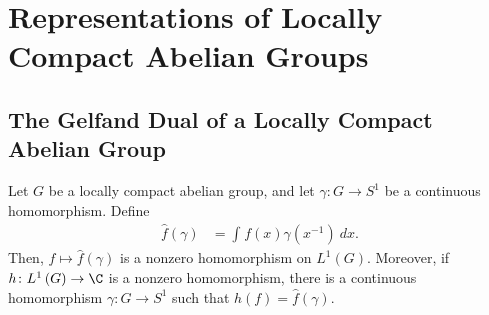 \documentclass[10pt]{mypackage}
\begin{document}
\section{Representations of Locally Compact Abelian Groups}%
\subsection{The Gelfand Dual of a Locally Compact Abelian Group}%
\begin{theorem}
  Let $G$ be a locally compact abelian group, and let $\gamma\colon G\to S^1$ be a continuous homomorphism. Define
  \begin{align*}
    \hat{f}\left( \gamma \right) &= \int_{}^{} f(x)\gamma\left( x^{-1} \right)\:dx.
  \end{align*}
  Then, $f\mapsto \hat{f}\left( \gamma \right)$ is a nonzero homomorphism on $L^1\left( G \right)$. Moreover, if $h\colon L^1\left( G \right)\to \C$ is a nonzero homomorphism, there is a continuous homomorphism $\gamma\colon G\to S^1$ such that $h\left( f \right) = \hat{f}\left( \gamma \right)$.
\end{theorem}
\end{document}
